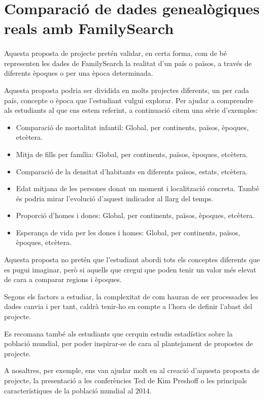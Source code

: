 \section{Comparació de dades genealògiques reals amb Family\-Search}

    \paragraph{}
    Aquesta proposta de projecte pretén validar, en certa forma, com de bé representen les dades de FamilySearch la realitat d'un país o països, a través de diferents èpoques o per una època determinada.

    Aquesta proposta podria ser dividida en molts projectes diferents, un per cada país, concepte o època que l'estudiant vulgui explorar. Per ajudar a comprendre als estudiants al que ens estem referint, a continuació citem una sèrie d'exemples:

    \begin{itemize}
        \item Comparació de mortalitat infantil: Global, per continents, països, èpoques, etcètera.
        \item Mitja de fills per família: Global, per continents, països, èpoques, etcètera.
        \item Comparació de la densitat d'habitants en diferents països, estats, etcètera.
        \item Edat mitjana de les persones donat un moment i localització concreta. Tam\-bé és podria mirar l'evolució d'aquest indicador al llarg del temps.
        \item Proporció d'homes i dones: Global, per continents, països, èpoques, etcètera.
        \item Esperança de vida per les dones i homes: Global, per continents, països, èpoques, etcètera.
    \end{itemize}

    Aquesta proposta no pretén que l'estudiant abordi tots els conceptes diferents que es pugui imaginar, però si aquells que cregui que poden tenir un valor més elevat de cara a comparar regions i èpoques.

    Segons els factors a estudiar, la complexitat de com hauran de ser processades les dades canvia i per tant, caldrà tenir-ho en compte a l'hora de definir l'abast del projecte.

    Es recomana també als estudiants que cerquin estudis estadístics sobre la població mundial, per poder inspirar-se de cara al plantejament de propostes de projecte.

    A nosaltres, per exemple, ens van ajudar molt en al creació d'aquesta proposta de projecte, la presentació a les conferències Ted de Kim Preshoff o les principals característiques de la població mundial al 2014.
